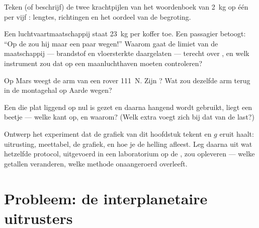 \begin{exercise}[$\star$]\label{exo:g9:weight-vs-mass:8}
Teken (of beschrijf) de twee krachtpijlen van het woordenboek
van \qty{2}{kg} op één  per vijf
: lengtes, richtingen en het oordeel van de begroting.
\end{exercise}

\begin{exercise}[$\star\star$]\label{exo:g9:weight-vs-mass:9}
Een luchtvaartmaatschappij staat \qty{23}{kg} per koffer toe. Een
passagier betoogt: ``Op de  zou hij maar een paar
 wegen!'' Waarom gaat de limiet van de maatschappij ---
brandstof en vloersterkte daargelaten --- terecht over
, en welk instrument zou dat op een maanluchthaven moeten
controleren?
\end{exercise}

\begin{exercise}[$\star\star$]\label{exo:g9:weight-vs-mass:10}
Op Mars weegt de arm van een rover \qty{111}{N}. Zijn
? Wat zou dezelfde arm terug in de montagehal op Aarde
wegen?
\end{exercise}

\begin{exercise}[$\star\star$]\label{exo:g9:weight-vs-mass:11}
Een  die plat liggend op nul is gezet en daarna
hangend wordt gebruikt, liegt een beetje --- welke kant op, en waarom?
(Welk extra  voegt zich bij dat van de last?)
\end{exercise}

\begin{exercise}[$\star\star\star$]\label{exo:g9:weight-vs-mass:12}
Ontwerp het experiment dat de grafiek van dit hoofdstuk tekent en $g$
eruit haalt: uitrusting, meettabel, de grafiek, en hoe je de helling
afleest. Leg daarna uit wat hetzelfde protocol, uitgevoerd in een
laboratorium op de , zou opleveren --- welke getallen
veranderen, welke methode onaangeroerd overleeft.
\end{exercise}

\section{Probleem: de interplanetaire uitrusters}

